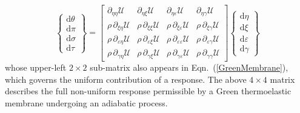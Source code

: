 \begin{equation}
\label{energies2D}
\left\{ \begin{matrix}
\mathrm{d} \theta \\ \mathrm{d} \pi \\
\mathrm{d} \sigma \\ \mathrm{d} \tau
\end{matrix} \right\} = \begin{bmatrix}
\partial_{\eta\eta} \mathcal{U} & 
\partial_{\eta\xi} \mathcal{U} & 
\partial_{\eta\varepsilon} \mathcal{U} & 
\partial_{\eta\gamma} \mathcal{U} \\ 
\rho \, \partial_{\xi\eta} \mathcal{U} & 
\rho \, \partial_{\xi\xi} \mathcal{U} & 
\rho \, \partial_{\xi\varepsilon} \mathcal{U} &
\rho \, \partial_{\xi\gamma} \mathcal{U} \\
\rho \, \partial_{\varepsilon\eta} \mathcal{U} & 
\rho \, \partial_{\varepsilon\xi} \mathcal{U} & 
\rho \, \partial_{\varepsilon\varepsilon} \mathcal{U} & 
\rho \, \partial_{\varepsilon\gamma} \mathcal{U} \\
\rho \, \partial_{\gamma\eta} \mathcal{U} & 
\rho \, \partial_{\gamma\xi} \mathcal{U} & 
\rho \, \partial_{\gamma\varepsilon} \mathcal{U} & 
\rho \, \partial_{\gamma\gamma} \mathcal{U} 
\end{bmatrix} 
\left\{ \begin{matrix}
\mathrm{d}\eta \\ \mathrm{d} \xi \\
\mathrm{d} \varepsilon \\ \mathrm{d} \gamma
\end{matrix} \right\}  
\end{equation}
whose upper-left $2\times 2$ sub-matrix also appears in Eqn.~(\ref{GreenMembrane}), which governs the uniform contribution of a response.  The above $4 \times 4$ matrix describes the full non-uniform response permissible by a Green thermo\-elastic membrane undergoing an adiabatic process.

